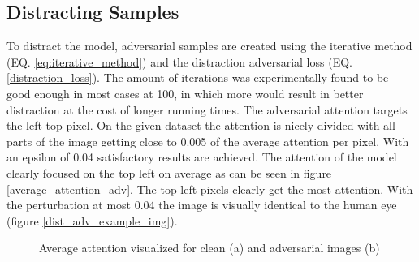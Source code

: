 \subsection*{Distracting Samples}
To distract the model, adversarial samples are created using the iterative method (EQ. \ref{eq:iterative_method}) and the distraction adversarial loss (EQ. \ref{distraction_loss}). The amount of iterations was experimentally found to be good enough in most cases at 100, in which more would result in better distraction at the cost of longer running times. The adversarial attention targets the left top pixel. On the given dataset the attention is nicely divided with all parts of the image getting close to 0.005 of the average attention per pixel. With an epsilon of 0.04 satisfactory results are achieved. The attention of the model clearly focused on the top left on average as can be seen in figure \ref{average_attention_adv}. The top left pixels clearly get the most attention. With the perturbation at most 0.04 the image is visually identical to the human eye (figure \ref{dist_adv_example_img}).

\begin{figure}[H]
    \centering
    \vspace{\floatsep}
    \caption{Average attention visualized for clean (a) and adversarial images (b)}
    \label{average_attention}
\end{figure}


